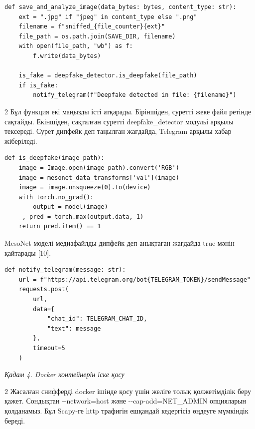 {\footnotesize
\begin{verbatim}
def save_and_analyze_image(data_bytes: bytes, content_type: str):
    ext = ".jpg" if "jpeg" in content_type else ".png"
    filename = f"sniffed_{file_counter}{ext}"
    file_path = os.path.join(SAVE_DIR, filename)
    with open(file_path, "wb") as f:
        f.write(data_bytes)

    is_fake = deepfake_detector.is_deepfake(file_path)
    if is_fake:
        notify_telegram(f"Deepfake detected in file: {filename}")
\end{verbatim}
}

\begin{multicols}{2}
Бұл функция екі маңызды істі атқарады. Біріншіден, суретті жеке файл
ретінде сақтайды. Екіншіден, сақталған суретті deepfake\_detector
модульі арқылы тексереді. Сурет дипфейк деп таңылған жағдайда, Telegram
арқылы хабар жіберіледі.
\end{multicols}

{\footnotesize
\begin{verbatim}
def is_deepfake(image_path):
    image = Image.open(image_path).convert('RGB')
    image = mesonet_data_transforms['val'](image)
    image = image.unsqueeze(0).to(device)
    with torch.no_grad():
        output = model(image)
    _, pred = torch.max(output.data, 1)
    return pred.item() == 1
\end{verbatim}
}

MesoNet моделі медиафайлды дипфейк деп анықтаған жағдайда true мәнін
қайтарады {[}10{]}.

{\footnotesize
\begin{verbatim}
def notify_telegram(message: str):
    url = f"https://api.telegram.org/bot{TELEGRAM_TOKEN}/sendMessage"
    requests.post(
        url,
        data={
            "chat_id": TELEGRAM_CHAT_ID,
            "text": message
        },
        timeout=5
    )
\end{verbatim}
}

\emph{Қадам 4. Docker контейнерін іске қосу}

\begin{multicols}{2}
Жасалған снифферді docker ішінде қосу үшін желіге толық қолжетімділік
беру қажет. Сондықтан -\/-network=host және -\/-cap-add=NET\_ADMIN
опцияларын қолданамыз. Бұл Scapy-ге http трафигін ешқандай кедергісіз
өңдеуге мүмкіндік береді.
\end{multicols}

